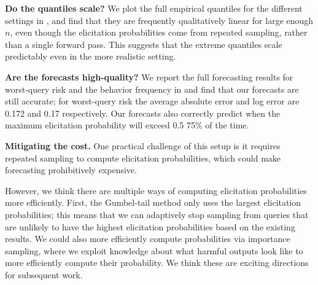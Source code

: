 \textbf{Do the quantiles scale?} We plot the full empirical quantiles for the different settings in , and find that they are frequently qualitatively linear for large enough $n$, even though the elicitation probabilities come from repeated sampling, rather than a single forward pass. This suggests that the extreme quantiles scale predictably even in the more realistic setting.

\textbf{Are the forecasts high-quality?} We report the full forecasting results for worst-query risk and the behavior frequency in  and find that our forecasts are still accurate; for worst-query risk the average absolute error and log error are 0.172 and 0.17 respectively. Our forecasts also correctly predict when the maximum elicitation probability will exceed 0.5 75\% of the time. 

\textbf{Mitigating the cost.} One practical challenge of this setup is it requires repeated sampling to compute elicitation probabilities, which could make forecasting prohibitively expensive. 

However, we think there are multiple ways of computing elicitation probabilities more efficiently. 
First, the Gumbel-tail method only uses the largest elicitation probabilities; this means that we can adaptively stop sampling from queries that are unlikely to have the highest elicitation probabilities based on the existing results. 
We could also more efficiently compute probabilities via importance sampling, where we exploit knowledge about what harmful outputs look like to more efficiently compute their probability. 
We think these are exciting directions for subsequent work.
